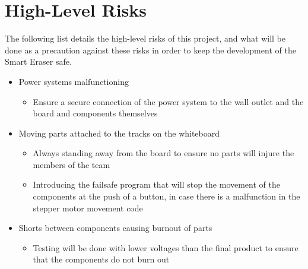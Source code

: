 \section{High-Level Risks}
The following list details the high-level risks of this project, and what will be done as a precaution against these risks in order to keep the development of the Smart Eraser safe.
\begin{itemize}
	\item Power systems malfunctioning
	\begin{itemize}
	\item Ensure a secure connection of the power system to the wall outlet and the board and components themselves
	\end{itemize}
	\item Moving parts attached to the tracks on the whiteboard
	\begin{itemize}
	\item Always standing away from the board to ensure no parts will injure the members of the team
	\item Introducing the failsafe program that will stop the movement of the components at the push of a button, in case there is a malfunction in the stepper motor movement code
	\end{itemize}
	\item Shorts between components causing burnout of parts
	\begin{itemize}
	\item Testing will be done with lower voltages than the final product to ensure that the components do not burn out
\end{itemize}
\end{itemize}

